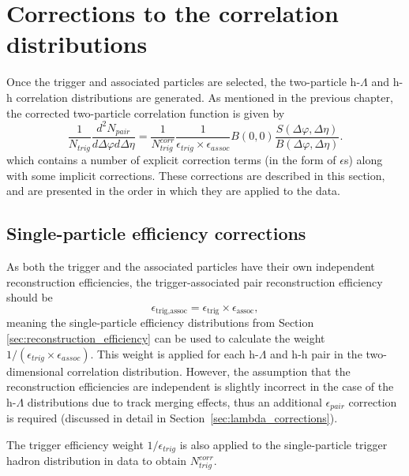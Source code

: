 \clearpage 

\section{Corrections to the correlation distributions}
\label{sec:corrections}

Once the trigger and associated particles are selected, the two-particle h-$\Lambda$ and h-h correlation distributions are generated. As mentioned in the previous chapter, the corrected two-particle correlation function is given by
%
\begin{equation}
    \frac{1}{N_{trig}}\frac{d^2N_{pair}}{d\Delta\varphi d\Delta\eta} = \frac{1}{N_{trig}^{corr}}\frac{1}{\epsilon_{trig}\times\epsilon_{assoc}}B(0,0)\frac{S(\Delta\varphi, \Delta\eta)}{B(\Delta\varphi, \Delta\eta)}.
\label{eq:corr_detector_ref}
\end{equation}
%
which contains a number of explicit correction terms (in the form of $\epsilon$s) along with some implicit corrections. These corrections are described in this section, and are presented in the order in which they are applied to the data.

\subsection{Single-particle efficiency corrections}
\label{sec:single_particle_corr}

As both the trigger and the associated particles have their own independent reconstruction efficiencies, the trigger-associated pair reconstruction efficiency should be
%
\begin{equation}
	\epsilon_{\text{trig}, \text{assoc}} = \epsilon_{\text{trig}}\times\epsilon_{\text{assoc}},
\end{equation} 
%
meaning the single-particle efficiency distributions from Section \ref{sec:reconstruction_efficiency} can be used to calculate the weight $1/(\epsilon_{trig}\times\epsilon_{assoc})$. This weight is applied for each h-$\Lambda$ and h-h pair in the two-dimensional correlation distribution. However, the assumption that the reconstruction efficiencies are independent is slightly incorrect in the case of the h-$\Lambda$ distributions due to track merging effects, thus an additional $\epsilon_{pair}$ correction is required (discussed in detail in Section~\ref{sec:lambda_corrections}).

The trigger efficiency weight $1/\epsilon_{trig}$ is also applied to the single-particle trigger hadron distribution in data to obtain $N_{trig}^{corr}$. 

